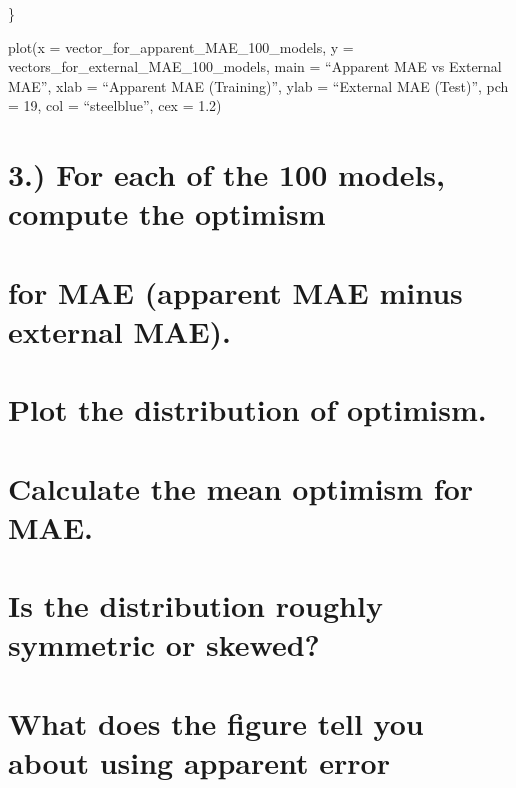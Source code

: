 \documentclass[
  letterpaper,
  DIV=11,
  numbers=noendperiod]{scrreprt}
\begin{document}
\}

plot(x = vector\_for\_apparent\_MAE\_100\_models, y =
vectors\_for\_external\_MAE\_100\_models, main = ``Apparent MAE vs
External MAE'', xlab = ``Apparent MAE (Training)'', ylab = ``External
MAE (Test)'', pch = 19, col = ``steelblue'', cex = 1.2)


\chapter{3.) For each of the 100 models, compute the
optimism}\label{for-each-of-the-100-models-compute-the-optimism}


\chapter{for MAE (apparent MAE minus external
MAE).}\label{for-mae-apparent-mae-minus-external-mae.}


\chapter{Plot the distribution of
optimism.}\label{plot-the-distribution-of-optimism.}


\chapter{Calculate the mean optimism for
MAE.}\label{calculate-the-mean-optimism-for-mae.}


\chapter{Is the distribution roughly symmetric or
skewed?}\label{is-the-distribution-roughly-symmetric-or-skewed}


\chapter{What does the figure tell you about using apparent
error}\label{what-does-the-figure-tell-you-about-using-apparent-error}

\end{document}
